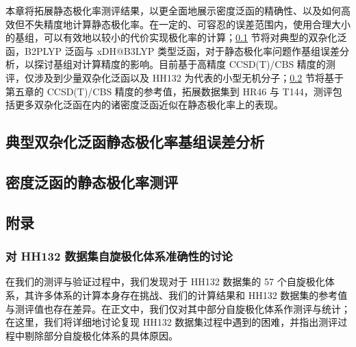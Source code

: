 本章将拓展静态极化率测评结果，以更全面地展示密度泛函的精确性、以及如何高效但不失精度地计算静态极化率。在一定的、可容忍的误差范围内，使用合理大小的基组，可以有效地以较小的代价实现极化率的计算；\ref{sec.6.basis-converg} 节将对典型的双杂化泛函，B2PLYP 泛函与 xDH@B3LYP 类型泛函，对于静态极化率问题作基组误差分析，以探讨基组对计算精度的影响。目前基于高精度 CCSD(T)/CBS 精度的测评，仅涉及到少量双杂化泛函以及 HH132\cite{Hait-Head-Gordon.PCCP.2018} 为代表的小型无机分子；\ref{sec.6.benchmark} 节将基于第五章的 CCSD(T)/CBS 精度的参考值，拓展数据集到 HR46\cite{Hickey-Rowley.JPCA.2014} 与 T144\cite{Wu-Thakkar.CPL.2015}，测评包括更多双杂化泛函在内的诸密度泛函近似在静态极化率上的表现。

\subsection{典型双杂化泛函静态极化率基组误差分析}
\label{sec.6.basis-converg}

\subsection{密度泛函的静态极化率测评}
\label{sec.6.benchmark}


\newpage

\subsection{附录}

\subsubsection{对 HH132 数据集自旋极化体系准确性的讨论}

在我们的测评与验证过程中，我们发现对于 \alert{HH132} 数据集\cite{Hait-Head-Gordon.PCCP.2018}的 57 个自旋极化体系，其许多体系的计算本身存在挑战、我们的计算结果和 HH132 数据集的参考值与测评值也存在差异。\alert{在正文中，我们仅对其中部分自旋极化体系作测评与统计；在这里，我们将详细地讨论复现 HH132 数据集过程中遇到的困难，并指出测评过程中剔除部分自旋极化体系的具体原因。}

